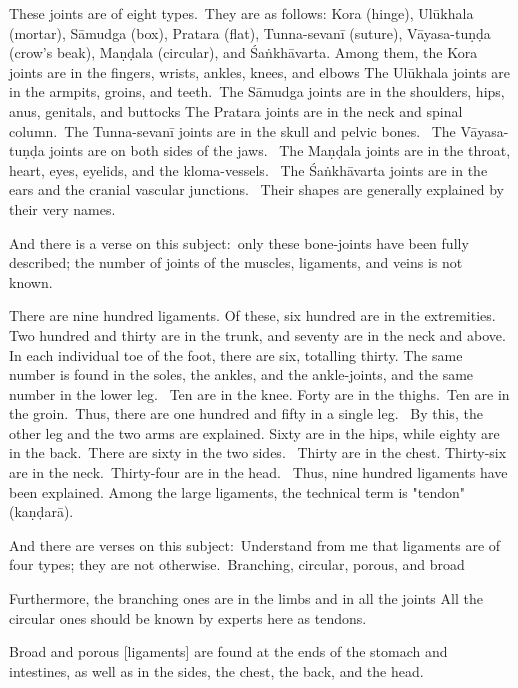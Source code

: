 \begin{translation}
\begin{tt}
\item[27]
These joints are of eight types. They are as follows: Kora (hinge), Ulūkhala (mortar), Sāmudga (box), Pratara (flat), Tunna-sevanī (suture), Vāyasa-tuṇḍa (crow's beak), Maṇḍala (circular), and Śaṅkhāvarta. Among them, the Kora joints are in the fingers, wrists, ankles, knees, and elbows The Ulūkhala joints are in the armpits, groins, and teeth. The Sāmudga joints are in the shoulders, hips, anus, genitals, and buttocks The Pratara joints are in the neck and spinal column. The Tunna-sevanī joints are in the skull and pelvic bones.  The Vāyasa-tuṇḍa joints are on both sides of the jaws.  The Maṇḍala joints are in the throat, heart, eyes, eyelids, and the kloma-vessels.  The Śaṅkhāvarta joints are in the ears and the cranial vascular junctions.  Their shapes are generally explained by their very names. 

\item[28]
And there is a verse on this subject: only these bone-joints have been fully described; the number of joints of the muscles, ligaments, and veins is not known.  


\item[29]
There are nine hundred ligaments. Of these, six hundred are in the extremities.  Two hundred and thirty are in the trunk, and seventy are in the neck and above.  In each individual toe of the foot, there are six, totalling thirty. The same number is found in the soles, the ankles, and the ankle-joints, and the same number in the lower leg.  Ten are in the knee. Forty are in the thighs. Ten are in the groin. Thus, there are one hundred and fifty in a single leg.  By this, the other leg and the two arms are explained. Sixty are in the hips, while eighty are in the back. There are sixty in the two sides.  Thirty are in the chest. Thirty-six are in the neck. Thirty-four are in the head.  Thus, nine hundred ligaments have been explained. Among the large ligaments, the technical term is "tendon" (kaṇḍarā). 


\item[30]
And there are verses on this subject: Understand from me that ligaments are of four types; they are not otherwise. Branching, circular, porous, and broad

\item[31]
Furthermore, the branching ones are in the limbs and in all the joints All the circular ones should be known by experts here as tendons. 
\item[32]
Broad and porous [ligaments] are found at the ends of the stomach and intestines, as well as in the sides, the chest, the back, and the head.


\end{tt}
\end{translation}
